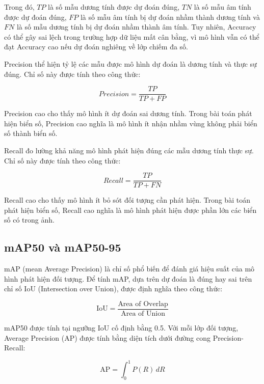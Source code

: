 \documentclass[13pt,a4paper]{report}
\begin{document}
Trong đó, \(TP\) là số mẫu dương tính được dự đoán đúng, \(TN\) là số mẫu âm tính được dự đoán đúng, \(FP\) là số mẫu âm tính bị dự đoán nhầm thành dương tính và \(FN\) là số mẫu dương tính bị dự đoán nhầm thành âm tính. Tuy nhiên, Accuracy có thể gây sai lệch trong trường hợp dữ liệu mất cân bằng, vì mô hình vẫn có thể đạt Accuracy cao nếu dự đoán nghiêng về lớp chiếm đa số.

Precision thể hiện tỷ lệ các mẫu được mô hình dự đoán là dương tính và thực sự đúng. Chỉ số này được tính theo công thức:

\begin{equation}
	Precision = \frac{TP}{TP + FP}
\end{equation}

Precision cao cho thấy mô hình ít dự đoán sai dương tính. Trong bài toán phát hiện biển số, Precision cao nghĩa là mô hình ít nhận nhầm vùng không phải biển số thành biển số.

Recall đo lường khả năng mô hình phát hiện đúng các mẫu dương tính thực sự. Chỉ số này được tính theo công thức:

\begin{equation}
	Recall = \frac{TP}{TP + FN}
\end{equation}

Recall cao cho thấy mô hình ít bỏ sót đối tượng cần phát hiện. Trong bài toán phát hiện biển số, Recall cao nghĩa là mô hình phát hiện được phần lớn các biển số có trong ảnh.

\subsection{mAP50 và mAP50-95}

mAP (mean Average Precision) là chỉ số phổ biến để đánh giá hiệu suất của mô hình phát hiện đối tượng. Để tính mAP, dựa trên dự đoán là đúng hay sai trên chỉ số IoU (Intersection over Union), được định nghĩa theo công thức:

\begin{equation}
	\text{IoU} = \frac{\text{Area of Overlap}}{\text{Area of Union}}
\end{equation}

mAP50 được tính tại ngưỡng IoU cố định bằng 0.5. Với mỗi lớp đối tượng, Average Precision (AP) được tính bằng diện tích dưới đường cong Precision-Recall:

\begin{equation}
	\text{AP} = \int_0^1 P(R)\, dR
\end{equation}
\end{document}
